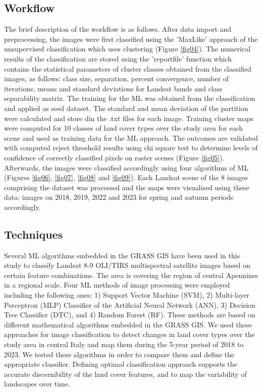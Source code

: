 \documentclass[preprint,12pt,authoryear]{elsarticle}
\begin{document}
\subsection{Workflow}
The brief description of the workflow is as follows. After data import and preprocessing, the images were first classified using the 'MaxLike' approach of the unsupervised classification which uses clustering (Figure \ref{fig04}). The numerical results of the classification are stored using the 'reportfile' function which contains the statistical parameters of cluster classes obtained from the classified images, as follows: class size, separation, percent convergence, number of iterations, means and standard deviations for Landsat bands and class separability matrix. The training for the ML was obtained from the classification and applied as seed dataset. The standard and mean deviation of the partition were calculated and store din the .txt files for each image. Training cluster maps were computed for 10 classes of land cover types over the study area for each scene and used as training data for the ML approach. The outcomes are validated with computed reject threshold results using chi square test to determine levels of confidence of correctly classified pixels on raster scenes (Figure \ref{fig05}). Afterwards, the images were classified accordingly using four algorithms of ML (Figures \ref{fig06}, \ref{fig07}, \ref{fig08} and \ref{fig09}). Each Landsat scene of the 8 images comprising the dataset was processed and the maps were visualised using these data: images on 2018, 2019, 2022 and 2023 for spring and autumn periods accordingly. 

\subsection{Techniques}

Several ML algorithms embedded in the GRASS GIS have been used in this study to classify Landsat 8-9 OLI/TIRS multispectral satellite images based on certain feature combinations. The area is covering the region of central Apennines in a regional scale. Four ML methods of image processing were employed including the following ones: 1) Support Vector Machine (SVM), 2) Multi-layer Perceptron (MLP) Classifier of the Artificial Neural Network (ANN), 3) Decision Tree Classifier (DTC), and 4) Random Forest (RF). These methods are based on different mathematical algorithms embedded in the GRASS GIS. We used these approaches for image classification to detect changes in land cover types over the study area in central Italy and map them during the 5-year period of 2018 to 2023. We tested these algorithms in order to compare them and define the appropriate classifier. Defining optimal classification approach supports the accurate discernibility of the land cover features, and to map the variability of landscapes over time.
\end{document}
